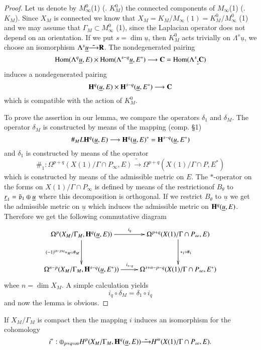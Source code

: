 \begin{proof}
Let us denote by $M^0_\infty$(1) (\resp. $K^0_M$) the connected components of $M_\infty$(1) (\resp. $K_M$). Since $X_M$ is connected we know that $X_M = K_M / M_\infty (1) = K^0_M / M^0_\infty$ (1) and we may assume that $\Gamma_M \subset M^0_\infty$ (1), since the Laplacian operator does not depend on an orientation. If we put $s = \dim \underline{u}$, then $K^0_M$ acts trivially on $\Lambda^s \underline{u}$, we choose an isomorphism $\Lambda^s \underline{u} \tilde{\longrightarrow} \mathbf{R}$. The nondegenerated pairing
$$
\operatorname{Hom} (\Lambda^q \underline{u}, E) \times \operatorname{Hom} (\Lambda^{s-q} \underline{u}, E^\ast) \longrightarrow \mathbf{C} = \operatorname{Hom} (\Lambda^s \underline, \mathbf{C})
$$
induces a nondegenerated pairing 
$$
\mathbf{H}^q (\underline{u}, E) \times \mathbf{H}^{s-q}(\underline{u}, E^\ast) \longrightarrow \mathbf{C}
$$
which is compatible with the action of $K^0_M$.

To prove the assertion in our lemma, we compare the operators $\delta_1$ and $\delta_M$. The operator $\delta_M$ is constructed by means of the mapping (comp. \S 1)
$$
\#_M L \mathbf{H}^q (\underline{u}, E) \longrightarrow \mathbf{H}^q (\underline{u}, E)^\ast = \mathbf{H}^{s-q} (\underline{u}, E^\ast)
$$
and $\delta_1$ is constructed by means of the operator 
$$
\#_1: \Omega^{p+q} (X(1) / \Gamma \cap P_\infty, E) \tilde{\longrightarrow} \Omega^{p+q} (X (1) / \Gamma \cap P, E^\ast)
$$
which is constructed by means of the admissible metric on $E$. The $\ast$-operator on the forms on $X(1) / \Gamma \cap P_\infty$ is defined by means of the restriction\pageoriginale of $B_\theta$ to $\underline{r}_1 = \bar{\mathfrak{p}}_1 \oplus \underline{u}$ where this decomposition is orthogonal. If we restrict $B_\theta$ to $\underline{u}$ we get the admissible metric on $\underline{u}$ which induces the admissible metric on $\mathbf{H}^q (\underline{u}, E)$. Therefore we get the following commutative diagram
$$
\xymatrix@R=1.2cm{
\Omega^p (X_M / \Gamma_M, \bH^q (\underline{u}, E)) \ar[r]^{i_q} \ar[d]_{(-1)^{(n-p)q} \ast_M \circ \#_M} & \Omega^{p+q} (X(1) / \Gamma \cap P_\infty, E) \ar[d]^{\ast_1 \circ \#_1}\\
\Omega^{n-p} (X_M/ \Gamma_M, \bH^{s-q} (\underline{u}, E^\ast)) \ar[r]^{i_{s-q}} & \Omega^{s+n - p-q} (X (1)/ \Gamma \cap P_{\infty}, E^\ast)
}
$$ 
whee $n = \dim X_M$. A simple calculation yields
$$
i_q \circ \delta_M = \delta_1 \circ i_q
$$
and now the lemma is obvious.
\end{proof}

\setcounter{theorem}{7}
\begin{theorem}\label{art5-thm2.8}
If $X_M/ \Gamma_M$ is compact then the mapping $i$ induces  an isomorphism for the cohomology
$$
i^\ast: \oplus_{p+q = m} H^p (X_M / \Gamma_M, \mathbf{H}^q (\underline{u}, E)) \tilde{\longrightarrow} H^m (X(1) / \Gamma \cap P_\infty, E).
$$
\end{theorem}

